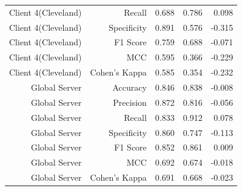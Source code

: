 \begin{table}[t]
\begin{tabular}{rrrrr}
Client 4(Cleveland) & Recall & 0.688 & 0.786 & 0.098 \\
Client 4(Cleveland) & Specificity & 0.891 & 0.576 & -0.315 \\
Client 4(Cleveland) & F1 Score & 0.759 & 0.688 & -0.071 \\
Client 4(Cleveland) & MCC & 0.595 & 0.366 & -0.229 \\
Client 4(Cleveland) & Cohen's Kappa & 0.585 & 0.354 & -0.232 \\
Global Server & Accuracy & 0.846 & 0.838 & -0.008 \\
Global Server & Precision & 0.872 & 0.816 & -0.056 \\
Global Server & Recall & 0.833 & 0.912 & 0.078 \\
Global Server & Specificity & 0.860 & 0.747 & -0.113 \\
Global Server & F1 Score & 0.852 & 0.861 & 0.009 \\
Global Server & MCC & 0.692 & 0.674 & -0.018 \\
Global Server & Cohen's Kappa & 0.691 & 0.668 & -0.023 \\
\bottomrule
\end{tabular}
\end{table}
